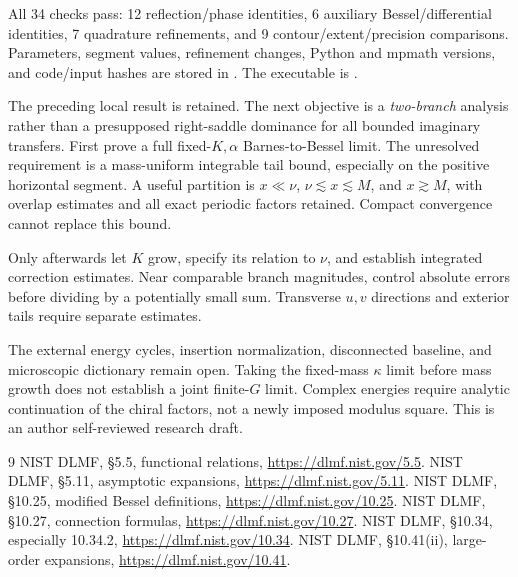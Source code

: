 \documentclass[11pt,a4paper]{article}
\begin{document}
All 34 checks pass: 12 reflection/phase identities,
6 auxiliary Bessel/differential identities, 7 quadrature refinements,
and 9 contour/extent/precision comparisons.
Parameters, segment values, refinement changes, Python and mpmath
versions, and code/input hashes are stored in
.
The executable is .

The preceding local result is retained. The next objective is a
\emph{two-branch} analysis rather than a presupposed right-saddle
dominance for all bounded imaginary transfers.
First prove a full fixed-\(K,\alpha\) Barnes-to-Bessel limit.
The unresolved requirement is a mass-uniform integrable tail bound,
especially on the positive horizontal segment. A useful partition is
\(x\ll\nu\), \(\nu\lesssim x\lesssim M\), and \(x\gtrsim M\),
with overlap estimates and all exact periodic factors retained.
Compact convergence cannot replace this bound.

Only afterwards let \(K\) grow, specify its relation to \(\nu\),
and establish integrated correction estimates. Near comparable
branch magnitudes, control absolute errors before dividing by a
potentially small sum. Transverse \(u,v\) directions and exterior
tails require separate estimates.

The external energy cycles, insertion normalization, disconnected
baseline, and microscopic dictionary remain open.
Taking the fixed-mass \(\kappa\) limit before mass growth does not
establish a joint finite-\(G\) limit. Complex energies require analytic
continuation of the chiral factors, not a newly imposed modulus square.
This is an author self-reviewed research draft.

\begin{thebibliography}{9}
 NIST DLMF, \S5.5, functional relations,
\url{https://dlmf.nist.gov/5.5}.
 NIST DLMF, \S5.11, asymptotic expansions,
\url{https://dlmf.nist.gov/5.11}.
 NIST DLMF, \S10.25, modified Bessel definitions,
\url{https://dlmf.nist.gov/10.25}.
 NIST DLMF, \S10.27, connection formulas,
\url{https://dlmf.nist.gov/10.27}.
 NIST DLMF, \S10.34, especially 10.34.2,
\url{https://dlmf.nist.gov/10.34}.
 NIST DLMF, \S10.41(ii), large-order expansions,
\url{https://dlmf.nist.gov/10.41}.
\end{thebibliography}
\end{document}
